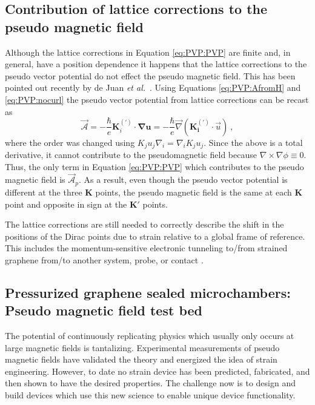 \subsection{Contribution of lattice corrections to the pseudo magnetic field}
Although the lattice corrections in Equation \ref{eq:PVP:PVP} are finite and, in general, have a position dependence it happens that the lattice corrections to the pseudo vector potential do not effect the pseudo magnetic field.
This has been pointed out recently by de Juan \emph{et al.}~\cite{DeJuan2013}. 
Using Equations \ref{eq:PVP:AfromH} and \ref{eq:PVP:nocurl} the pseudo vector potential from lattice corrections can be recast as 
\begin{equation*}
  \vec{\mathcal{A}}=-\frac{\hbar}{e} \bm{K}_i^{(')} \cdot \bm{\nabla u} 
  = - \frac{\hbar}{e} \vec{\nabla} \left( \bm{K_i^{(')}} \cdot \vec{u} \right) \ ,
\end{equation*}
where the order was changed using $K_j u_j \nabla_i=\nabla_i K_j u_j$.
Since the above is a total derivative, it cannot contribute to the pseudomagnetic field because $\nabla\times\nabla \phi \equiv 0$.
Thus, the only term in Equation \ref{eq:PVP:PVP} which contributes to the pseudo magnetic field is $\vec{\mathcal{A}}_p$.
As a result, even though the pseudo vector potential is different at the three $\bm{K}$ points, the pseudo magnetic field is the same at each $\bm{K}$ point and opposite in sign at the $\bm{K}'$ points.

The lattice corrections are still needed to correctly describe the shift in the positions of the Dirac points due to strain relative to a global frame of reference.
This includes the momentum-sensitive electronic tunneling to/from strained graphene from/to another system, probe, or contact \cite{Fogler2008}.

\subsection{Pressurized graphene sealed microchambers: Pseudo magnetic field test bed}
The potential of continuously replicating physics which usually only occurs at large magnetic fields is tantalizing.
Experimental measurements of pseudo magnetic fields \cite{Levy2010,Yan2012,Yeh2011,Gomes2012} have validated the theory and energized the idea of strain engineering.
However, to date no strain device has been predicted, fabricated, and then shown to have the desired properties.
The challenge now is to design and build devices which use this new science to enable unique device functionality.


